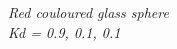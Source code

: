 \documentclass[a4,12pt]{article}
\begin{document}
\begin{center}
\begin{minipage}[b]{0.40\linewidth}
\begin{center}
				\textit{Red couloured glass sphere\\Kd = 0.9, 0.1, 0.1}\\
			\end{center}
		\end{minipage}
	\end{center}
	
	
	
\end{document}
